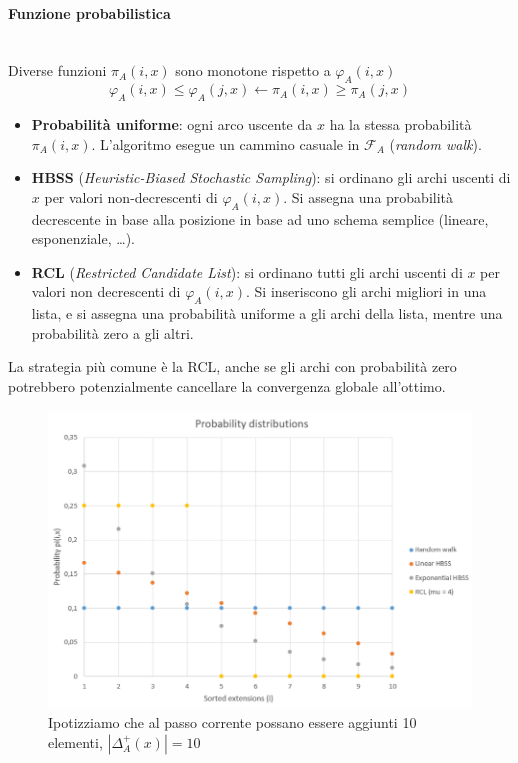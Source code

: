 \documentclass{article}
\begin{document}
\paragraph{Funzione probabilistica}\mbox{}\\
Diverse funzioni $\pi_A(i,x)$ sono monotone rispetto a $\varphi_A(i,x)$
$$\varphi_A(i,x)\leq\varphi_A(j,x)\longleftarrow\pi_A(i,x)\geq\pi_A(j,x)$$
\begin{itemize}
    \item \textbf{Probabilità uniforme}: ogni arco uscente da $x$ ha la stessa probabilità $\pi_A(i,x)$.
          L'algoritmo esegue un cammino casuale in $\mathcal{F}_A$ (\textit{random walk}).
    \item \textbf{HBSS} (\textit{Heuristic-Biased Stochastic Sampling}): si ordinano gli archi uscenti di $x$
          per valori non-decrescenti di $\varphi_A(i,x)$. Si assegna una probabilità decrescente in base alla posizione
          in base ad uno schema semplice (lineare, esponenziale, \dots).
    \item \textbf{RCL} (\textit{Restricted Candidate List}): si ordinano tutti gli archi uscenti di $x$ per valori
          non decrescenti di $\varphi_A(i,x)$. Si inseriscono gli archi migliori in una lista, e si assegna una probabilità
          uniforme a gli archi della lista, mentre una probabilità zero a gli altri.
\end{itemize}
La strategia più comune è la RCL, anche se gli archi con probabilità zero potrebbero potenzialmente cancellare
la convergenza globale all'ottimo.
\begin{figure}[H]
    \centering
    \includegraphics[scale=0.5]{images/prob_func.png}
    \caption{Ipotizziamo che al passo corrente possano essere aggiunti 10 elementi, $|\Delta_A^+(x)|=10$}
\end{figure}
\end{document}
